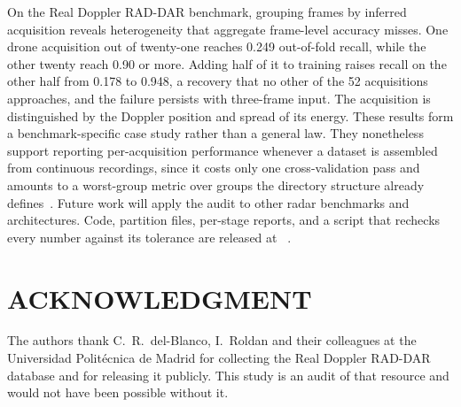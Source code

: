 \documentclass{ICIC2026}
\begin{document}
On the Real Doppler RAD-DAR benchmark, grouping frames by inferred acquisition reveals heterogeneity that aggregate frame-level accuracy misses. One drone acquisition out of twenty-one reaches 0.249 out-of-fold recall, while the other twenty reach 0.90 or more. Adding half of it to training raises recall on the other half from 0.178 to 0.948, a recovery that no other of the 52 acquisitions approaches, and the failure persists with three-frame input. The acquisition is distinguished by the Doppler position and spread of its energy. These results form a benchmark-specific case study rather than a general law. They nonetheless support reporting per-acquisition performance whenever a dataset is assembled from continuous recordings, since it costs only one cross-validation pass and amounts to a worst-group metric over groups the directory structure already defines~\cite{sagawa2020}. Future work will apply the audit to other radar benchmarks and architectures. Code, partition files, per-stage reports, and a script that rechecks every number against its tolerance are released at \codeurl{}~\cite{artefact2026}.


\section*{ACKNOWLEDGMENT}

The authors thank C.~R.~del-Blanco, I.~Roldan and their colleagues at the Universidad Polit\'ecnica de Madrid for collecting the Real Doppler RAD-DAR database and for releasing it publicly. This study is an audit of that resource and would not have been possible without it.
\end{document}
